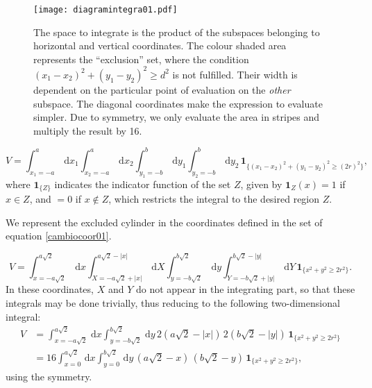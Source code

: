 \documentclass[a4paper,10pt, jcp, aps, preprint]{revtex4-1}
\newcommand{\rd}{\, \mathrm{d}}
\newcommand{\indicator}[1]{\mathbf{1}_{ \{   #1 \} } }
\begin{document}
\begin{figure}[h]
  \centering
  \texttt{[image: diagramintegra01.pdf]}
  \caption{The space to integrate is the product of the subspaces
    belonging to horizontal and vertical coordinates. The colour
    shaded area represents the ``exclusion'' set, where the condition 
    $ (x_1-x_2)^2 + (y_1-y_2)^2 \ge d^2 $ is not fulfilled. 
    Their width is dependent on the particular point of evaluation
    on the \emph{other} subspace. The diagonal coordinates
    make the expression to evaluate simpler. Due to 
    symmetry, we only evaluate the area in stripes and
    multiply the result by 16.}\label{diagintegra01}
\end{figure}

\begin{equation}\label{volindic}
 V = \int_{x_1 = -a}^a \rd x_1 \int_{x_2 = -a}^a \rd x_2 
\int_{y_1 = -b}^b \rd y_1 \int_{y_2 = -b}^b \rd y_2 \, \indicator{ (x_1-x_2)^2 + (y_1-y_2)^2 \ge (2r)^2 },
\end{equation}
where $\indicator{Z}$ indicates the indicator function of the set $Z$, given by $\mathbf{1}_Z (x) = 1$ if $x \in Z$, and $=0$ if $x \notin Z$, which restricts the integral to the desired region $Z$.

We represent the excluded cylinder in the coordinates defined in 
the set of equation \ref{cambiocoor01}. 

\begin{equation}\label{integraltotal}
 V = \int_{x=-a \sqrt{2}}^{a \sqrt{2}} \rd x 
\int_{X=-a \sqrt{2} + |x| }^{a \sqrt{2} - |x|}  \rd X
 \int_{y=-b \sqrt{2}}^{b \sqrt{2}} \rd y
\int_{Y=-b \sqrt{2} + |y| }^{b \sqrt{2}-|y|}  \rd Y
\, \indicator{ x^2 + y^2 \ge 2r^2  }.
\end{equation}
In these coordinates, $X$ and $Y$ do not appear in the integrating part, so that these integrals may be done trivially, thus reducing to the following two-dimensional integral:
\begin{align}
 V &= \int_{x=-a \sqrt{2}}^{a \sqrt{2}} \rd x  \int_{y=-b \sqrt{2}}^{b \sqrt{2}} \rd y
\, 2 \left( a \sqrt{2} - |x| \right) \, 2 \left( b \sqrt{2} - |y| \right) \,  \indicator{ x^2 + y^2 \ge 2r^2 } \\
&= 16 \int_{x=0}^{a \sqrt{2}} \rd x  \int_{y=0}^{b \sqrt{2}} \rd y
\, \left( a \sqrt{2} - x \right) \, \left( b \sqrt{2} - y \right) \,  \indicator{ x^2 + y^2 \ge 2r^2 },
\end{align}
using the symmetry.
\end{document}
